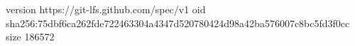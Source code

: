 version https://git-lfs.github.com/spec/v1
oid sha256:75dbf6ca262fde722463304a4347d520780424d98a42ba576007c8bc5fd3f0cc
size 186572
